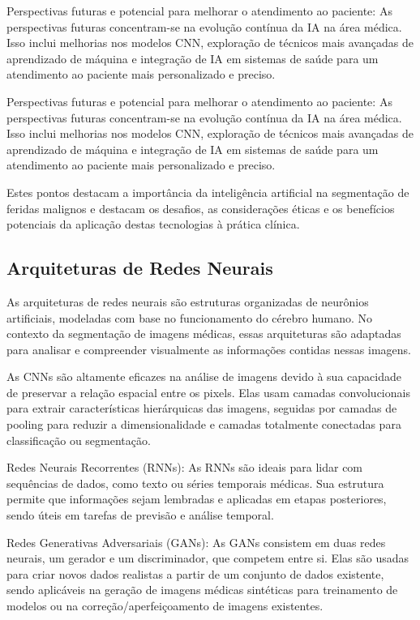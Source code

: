 Perspectivas futuras e potencial para melhorar o atendimento ao paciente: As perspectivas futuras concentram-se na evolução contínua da IA na área médica. Isso inclui melhorias nos modelos \ac{CNN}, exploração de técnicos mais avançadas de aprendizado de máquina e integração de IA em sistemas de saúde para um atendimento ao paciente mais personalizado e preciso.

Perspectivas futuras e potencial para melhorar o atendimento ao paciente: As perspectivas futuras concentram-se na evolução contínua da IA na área médica. Isso inclui melhorias nos modelos \ac{CNN}, exploração de técnicos mais avançadas de aprendizado de máquina e integração de IA em sistemas de saúde para um atendimento ao paciente mais personalizado e preciso.

Estes pontos destacam a importância da inteligência artificial na segmentação de feridas malignos e destacam os desafios, as considerações éticas e os benefícios potenciais da aplicação destas tecnologias à prática clínica.

\subsection{Arquiteturas de Redes Neurais}

As arquiteturas de redes neurais são estruturas organizadas de neurônios artificiais, modeladas com base no funcionamento do cérebro humano. No contexto da segmentação de imagens médicas, essas arquiteturas são adaptadas para analisar e compreender visualmente as informações contidas nessas imagens.

As \ac{CNNs} são altamente eficazes na análise de imagens devido à sua capacidade de preservar a relação espacial entre os pixels. Elas usam camadas convolucionais para extrair características hierárquicas das imagens, seguidas por camadas de pooling para reduzir a dimensionalidade e camadas totalmente conectadas para classificação ou segmentação.

Redes Neurais Recorrentes (RNNs): As RNNs são ideais para lidar com sequências de dados, como texto ou séries temporais médicas. Sua estrutura permite que informações sejam lembradas e aplicadas em etapas posteriores, sendo úteis em tarefas de previsão e análise temporal.

Redes Generativas Adversariais (GANs): As GANs consistem em duas redes neurais, um gerador e um discriminador, que competem entre si. Elas são usadas para criar novos dados realistas a partir de um conjunto de dados existente, sendo aplicáveis na geração de imagens médicas sintéticas para treinamento de modelos ou na correção/aperfeiçoamento de imagens existentes.

